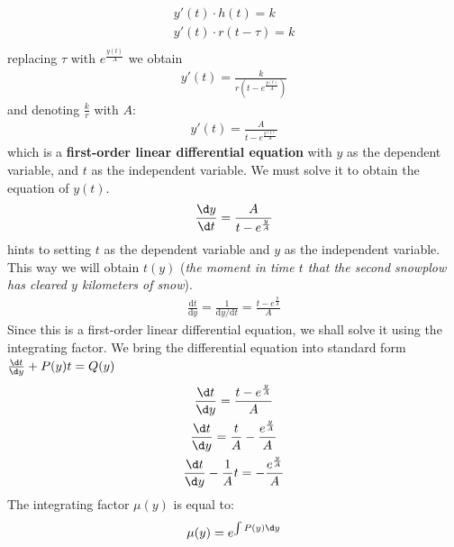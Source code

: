 \documentclass[a4paper,12pt]{article}
\begin{document}
\begin{itemize}
            \begin{gather*}
                y'(t) \cdot h(t) = k \\
                y'(t) \cdot r(t-\tau) = k \\
            \end{gather*}
            replacing $\tau$ with \(e^{\frac{y(t)}{A}}\) we obtain
            \begin{gather*}
                y'(t) = \frac{k}{r(t-e^{\frac{y(t)}{A}})}
            \end{gather*}
            and denoting \(\frac{k}{r}\) with \(A\):
            \begin{gather*}
                y'(t) = \frac{A}{t - e^{\frac{y(t)}{A}}}
            \end{gather*}
            which is a \textbf{first-order linear differential equation} with \(y\) as the dependent variable, and \(t\) as the independent variable. We must solve it to obtain the equation of \(y(t)\).
            \begin{gather*}
                \frac{\d y}{\d t} = \frac{A}{t - e^{\frac{y}{A}}} \\
            \end{gather*}
            \cite{Kent_Nagle2018-ig} hints to setting \(t\) as the dependent variable and \(y\) as the independent variable. This way we will obtain \(t(y)\) (\emph{the moment in time $t$ that the second snowplow has cleared $y$ kilometers of snow}).
            \begin{gather*}
                \frac{\mathrm{d}t}{\mathrm{d}y} = \frac{1}{\mathrm{d}y / \mathrm{d}t} = \frac{t - e^{\frac{y}{A}}}{A}
            \end{gather*}
            Since this is a first-order linear differential equation, we shall solve it using the integrating factor. We bring the differential equation into standard form \(\frac{\d t}{\d y} + P(y)t = Q(y)\)
            \begin{gather*}
                \frac{\d t}{\d y} = \frac{t - e^{\frac{y}{A}}}{A} \\
                \frac{\d t}{\d y} = \frac{t}{A} - \frac{e^{\frac{y}{A}}}{A} \\
                \frac{\d t}{\d y} - \frac{1}{A}t = - \frac{e^{\frac{y}{A}}}{A}
            \end{gather*}
            The integrating factor \(\mu(y)\) is equal to:
            \begin{gather*}
                \mu(y) = e^{\int P(y) \d y} \\

\end{gather*}
\end{itemize}
\end{document}
